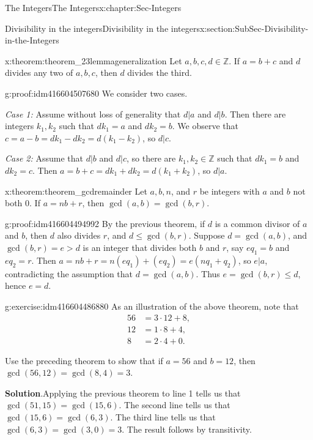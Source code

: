 \documentclass[oneside,10pt,]{book}
\numberwithin{equation}{section}
\renewcommand{\le}{\leqslant}
\def\Z{{\mathbb Z}}
\newcommand{\amp}{&}
\begin{document}
\begin{chapterptx}{The Integers}{}{The Integers}{}{}{x:chapter:Sec-Integers}
\begin{sectionptx}{Divisibility in the integers}{}{Divisibility in the integers}{}{}{x:section:SubSec-Divisibility-in-the-Integers}
\begin{theorem}{}{}{x:theorem:theorem_23lemmageneralization}
Let \(a,b,c,d\in \Z\). If \(a = b+c\) and \(d\) divides any two of \(a,b,c\), then \(d\) divides the third.%
\end{theorem}
\begin{proofptx}{}{g:proof:idm416604507680}
We consider two cases.%
\par
\emph{Case 1:} Assume without loss of generality that \(d|a\) and \(d|b\). Then there are integers \(k_1, k_2\) such that \(d k_1 = a\) and \(d k_2 = b\). We observe that \(c = a - b = d k_1 - d k_2 = d(k_1 - k_2)\), so \(d|c\).%
\par
\emph{Case 2:} Assume that \(d| b\) and \(d|c\), so there are \(k_1,k_2\in \Z\) such that \(d k_1 = b\) and \(d k_2 = c\). Then \(a = b+ c = dk_1 + dk_2 = d(k_1 + k_2)\), so \(d|a\).%
\end{proofptx}
\begin{theorem}{}{}{x:theorem:theorem_gcdremainder}%
Let \(a,b,n\), and \(r\) be integers with \(a\) and \(b\) not both 0. If \(a = n b + r\), then \(\gcd(a,b) = \gcd(b,r)\).%
\end{theorem}
\begin{proofptx}{}{g:proof:idm416604494992}
By the previous theorem, if \(d\) is a common divisor of \(a\) and \(b\), then \(d\) also divides \(r\), and \(d \le \gcd(b,r)\). Suppose \(d = \gcd(a,b)\), and \(\gcd(b,r)= e > d\) is an integer that divides both \(b\) and \(r\), say \(e q_1 = b\) and \(e q_2 = r\). Then \(a = n b + r = n (e q_1) + (e q_2)= e (n q_1 + q_2)\), so \(e|a\), contradicting the assumption that \(d = \gcd(a,b)\). Thus \(e = \gcd(b,r) \le d\), hence \(e = d\).%
\end{proofptx}
\begin{inlineexercise}{}{g:exercise:idm416604486880}%
As an illustration of the above theorem, note that%
\begin{align*}
56 \amp = 3\cdot 12 + 8,\\
12 \amp = 1\cdot 8 +4,\\
8 \amp = 2\cdot 4 + 0\text{.}
\end{align*}
%
\par
Use the preceding theorem to show that if \(a = 56\) and \(b = 12\), then \(\gcd(56, 12) = \gcd(8, 4) = 3\).%
\par\smallskip%
\noindent\textbf{Solution}.\hypertarget{g:solution:idm416604482256}{}\quad{}Applying the previous theorem to line 1 tells us that \(\gcd(51,15) = \gcd(15, 6)\). The second line tells us that \(\gcd(15,6) = \gcd(6,3)\). The third line tells us that \(\gcd(6,3) = \gcd(3,0) = 3\). The result follows by transitivity.%

\end{inlineexercise}
\end{sectionptx}
\end{chapterptx}
\end{document}
